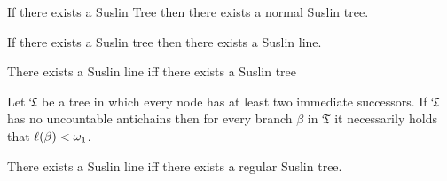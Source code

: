 \begin{lem}
	If there exists a Suslin Tree then there exists a normal Suslin tree.
\end{lem}

\begin{lem}
	If there exists a Suslin tree then there exists a Suslin line.
\end{lem}

\begin{thm}
	There exists a Suslin line iff there exists a Suslin tree
\end{thm}

\begin{prp}
	Let $\mathfrak{T}$ be a tree in which every node has at least two immediate successors.  If $\mathfrak{T}$ has no uncountable antichains then for every branch $\beta$ in $\mathfrak{T}$ it necessarily holds that $\ell(\beta)<\omega_1$.
\end{prp}

\begin{thm}
	There exists a Suslin line iff there exists a regular Suslin tree.
\end{thm}
